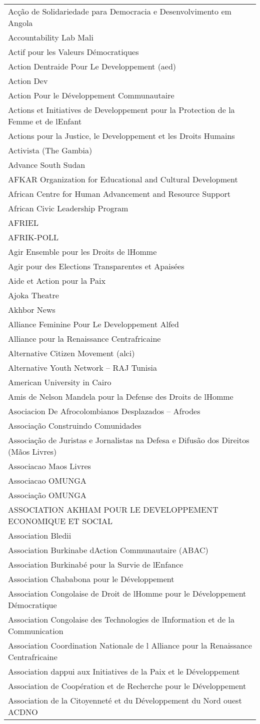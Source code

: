 \begin{longtable}[]{@{}l@{}}
\toprule
\endhead
Acção de Solidariedade para Democracia e Desenvolvimento em
Angola\tabularnewline
Accountability Lab Mali\tabularnewline
Actif pour les Valeurs Démocratiques\tabularnewline
Action Dentraide Pour Le Developpement (aed)\tabularnewline
Action Dev\tabularnewline
Action Pour le Développement Communautaire\tabularnewline
Actions et Initiatives de Developpement pour la Protection de la Femme
et de lEnfant\tabularnewline
Actions pour la Justice, le Developpement et les Droits
Humains\tabularnewline
Activista (The Gambia)\tabularnewline
Advance South Sudan\tabularnewline
AFKAR Organization for Educational and Cultural
Development\tabularnewline
African Centre for Human Advancement and Resource Support\tabularnewline
African Civic Leadership Program\tabularnewline
AFRIEL\tabularnewline
AFRIK-POLL\tabularnewline
Agir Ensemble pour les Droits de lHomme\tabularnewline
Agir pour des Elections Transparentes et Apaisées\tabularnewline
Aide et Action pour la Paix\tabularnewline
Ajoka Theatre\tabularnewline
Akhbor News\tabularnewline
Alliance Feminine Pour Le Developpement Alfed\tabularnewline
Alliance pour la Renaissance Centrafricaine\tabularnewline
Alternative Citizen Movement (alci)\tabularnewline
Alternative Youth Network -- RAJ Tunisia\tabularnewline
American University in Cairo\tabularnewline
Amis de Nelson Mandela pour la Defense des Droits de
lHomme\tabularnewline
Asociacion De Afrocolombianos Desplazados -- Afrodes\tabularnewline
Associação Construindo Comunidades\tabularnewline
Associação de Juristas e Jornalistas na Defesa e Difusão dos Direitos
(Mãos Livres)\tabularnewline
Associacao Maos Livres\tabularnewline
Associacao OMUNGA\tabularnewline
Associação OMUNGA\tabularnewline
ASSOCIATION AKHIAM POUR LE DEVELOPPEMENT ECONOMIQUE ET
SOCIAL\tabularnewline
Association Bledii\tabularnewline
Association Burkinabe dAction Communautaire (ABAC)\tabularnewline
Association Burkinabé pour la Survie de lEnfance\tabularnewline
Association Chababona pour le Développement\tabularnewline
Association Congolaise de Droit de lHomme pour le Développement
Démocratique\tabularnewline
Association Congolaise des Technologies de lInformation et de la
Communication\tabularnewline
Association Coordination Nationale de l Alliance pour la Renaissance
Centrafricaine\tabularnewline
Association dappui aux Initiatives de la Paix et le
Développement\tabularnewline
Association de Coopération et de Recherche pour le
Développement\tabularnewline
Association de la Citoyenneté et du Développement du Nord ouest
ACDNO\tabularnewline

\end{longtable}
